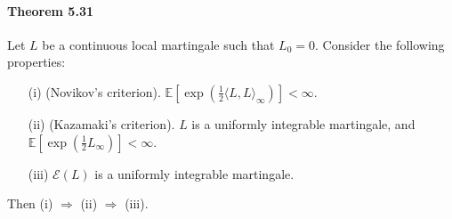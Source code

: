 \documentclass{article}
\numberwithin{equation}{section}
\newcommand{\E}{\mathbb{E}}
\theoremstyle{plain}
\theoremstyle{definition}
\begin{document}
\paragraph{Theorem 5.31\label{thm:5.31}} Let $L$ be a continuous local martingale such that $L_0=0$. Consider the following properties:
\begin{itemize}
	\item[(i)] (Novikov's criterion). $\E\left[\exp\left(\frac{1}{2}\langle L,L\rangle_\infty\right)\right]<\infty$.
	\item[(ii)] (Kazamaki's criterion). $L$ is a uniformly integrable martingale, and $\E\left[\exp\left(\frac{1}{2}L_\infty\right)\right]<\infty$.
	\item[(iii)] $\mathscr{E}(L)$ is a uniformly integrable martingale.
\end{itemize}
Then (i) $\Rightarrow$ (ii) $\Rightarrow$ (iii).
\end{document}
